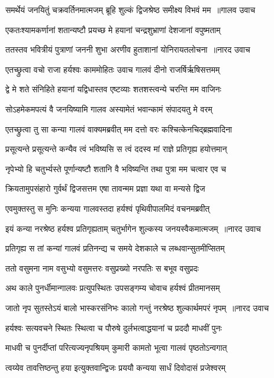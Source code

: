 \threelineshloka
{समर्थेयं जनयितुं चक्रवर्तिनमात्मजम्}
{ब्रूहि शुल्कं द्विजश्रेष्ठ समीक्ष्य विभवं मम ॥गालव उवाच}
{}


\twolineshloka
{एकतःश्यामकर्णानां शतान्यष्टौ प्रयच्छ मे}
{हयानां चन्द्रशुभ्राणां देशजानां वपुष्मताम्}


\threelineshloka
{ततस्तव भवित्रीयं पुत्राणां जननी शुभा}
{अरणीव हुताशानां योनिरायतलोचना ॥नारद उवाच}
{}


\twolineshloka
{एतच्छ्रुत्वा वचो राजा हर्यश्वः काममोहितः}
{उवाच गालवं दीनो राजर्षिर्ऋषिसत्तमम्}


\twolineshloka
{द्वे मे शते संनिहिते हयानां यद्विधास्तव}
{एष्टव्याः शतशस्त्वन्ये चरन्ति मम वाजिनः}


\twolineshloka
{सोऽहमेकमपत्यं वै जनयिष्यामि गालव}
{अस्यामेतं भवान्कामं संपादयतु मे वरम्}


\twolineshloka
{एतच्छ्रुत्वा तु सा कन्या गालवं वाक्यमब्रवीत्}
{मम दत्तो वरः कश्चित्केनचिद्ब्रह्मवादिना}


\twolineshloka
{प्रसूत्यन्ते प्रसूत्यन्ते कन्यैव त्वं भविष्यसि}
{स त्वं ददस्व मां राज्ञे प्रतिगृह्य हयोत्तमान्}


\twolineshloka
{नृपेभ्यो हि चतुर्भ्यस्ते पूर्णान्यष्टौ शतानि वै}
{भविष्यन्ति तथा पुत्रा मम चत्वार एव च}


\twolineshloka
{क्रियतामुपसंहारो गुर्वर्थं द्विजसत्तम}
{एषा तावन्मम प्रज्ञा यथा वा मन्यसे द्विज}


\twolineshloka
{एवमुक्तस्तु स मुनिः कन्यया गालवस्तदा}
{हर्यश्वं पृथिवीपालमिदं वचनमब्रवीत्}


\threelineshloka
{इयं कन्या नरश्रेष्ठ हर्यश्व प्रतिगृह्यताम्}
{चतुर्भागेन शुल्कस्य जनयस्वैकमात्मजम् ॥नारद उवाच}
{}


\twolineshloka
{प्रतिगृह्य स तां कन्यां गालवं प्रतिनन्द्य च}
{समये देशकाले च लब्धवान्सुतमीप्सितम्}


\twolineshloka
{ततो वसुमना नाम वसुभ्यो वसुमत्तरः}
{वसुप्रख्यो नरपतिः स बभूव वसुप्रदः}


\twolineshloka
{अथ काले पुनर्धीमान्गालवः प्रत्युपस्थितः}
{उपसङ्गम्य चोवाच हर्यश्वं प्रीतमानसम्}


\threelineshloka
{जातो नृप सुतस्तेऽयं बालो भास्करसंनिभः}
{कालो गन्तुं नरश्रेष्ठ शुल्कार्थमपरं नृपम् ॥नारद उवाच}
{}


\twolineshloka
{हर्यश्वः सत्यवचने स्थितः स्थित्वा च पौरुषे}
{दुर्लभत्वाद्धयानां च प्रददौ माधवीं पुनः}


\twolineshloka
{माधवी च पुनर्दीप्तां परित्यज्यनृपश्रियम्}
{कुमारी कामतो भूत्वा गालवं पृष्ठतोऽन्वगात्}


\twolineshloka
{त्वय्येव तावत्तिष्ठन्तु हया इत्युक्तवान्द्विजः}
{प्रययौ कन्यया सार्धं दिवोदासं प्रजेश्वरम्}


